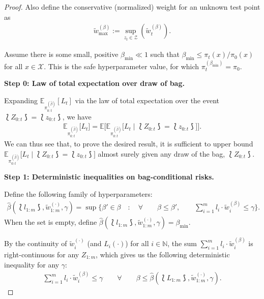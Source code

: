 \begin{proof}
Also define the conservative (normalized) weight for an unknown test point as
\begin{align*}
    \tilde{w}_{\max}^{(\beta)}:=\sup_{z_t\in \mathcal{Z}}(\tilde{w}_t^{(\beta)}).
\end{align*}

Assume there is some small, positive $\beta_{\min}\ll1$ such that $\beta_{\min}\leq \pi_t(x)/\pi_0(x)$ for all $x\in \mathcal{X}$. This is the safe hyperparameter value, for which $\pi_t^{(\beta_{\min})}=\pi_0$.

\vspace{1cm}


\textbf{Step 0: Law of total expectation over draw of bag.}

Expanding $\mathbb{E}_{\pi_{0:t}^{(\hat\beta)}}[L_{t}]$ via the law of total expectation over the event $\lbag Z_{0:t} \rbag = \lbag z_{0:t} \rbag$, we have
\begin{align}\label{eq:cpc_step_0}
    \mathbb{E}_{\pi_{0:t}^{(\hat\beta)}}\big[L_{t}\big] = \mathbb{E}\Big[\mathbb{E}_{\pi_{0:t}^{(\hat\beta)}}\Big[L_{t} \mid \lbag Z_{0:t} \rbag = \lbag z_{0:t} \rbag\Big]\Big].
\end{align}
We can thus see that, to prove the desired result, it is sufficient to upper bound $\mathbb{E}_{\pi_{0:t}^{(\hat\beta)}}\big[L_{t} \mid \lbag Z_{0:t} \rbag = \lbag z_{0:t} \rbag\big]$ almost surely given any draw of the bag, $\lbag Z_{0:t}\rbag$. 


\vspace{1cm}

\textbf{Step 1: Deterministic inequalities on bag-conditional risks.} 


Define the following family of hyperparameters:
\begin{align*}
    \hat{\beta}(\lbag l_{1:m} \rbag, \tilde{w}_{1:m}^{(\cdot)},  \gamma) = \sup \Big\{\beta' \in \beta \quad : \quad \forall \qquad \beta \leq \beta', \qquad \sum_{i=1}^ml_i\cdot \tilde{w}_i^{(\beta)} \leq \gamma \Big\}.
\end{align*}
When the set is empty, define $\hat{\beta}(\lbag l_{1:m} \rbag, \tilde{w}_{1:m}^{(\cdot)},  \gamma)=\beta_{\min}$.

By the continuity of $\tilde{w}_{i}^{(\cdot)}$ (and $L_i(\cdot)$) for all $i\in \mathbb{N}$, the sum $\sum_{i=1}^ml_i\cdot \tilde{w}_i^{(\beta)}$ is right-continuous for any $Z_{1:m}$, which gives us the following deterministic inequality for any $\gamma$:
\begin{align}
    \label{eq:cpc_step_1}
    \sum_{i=1}^ml_i\cdot \tilde{w}_i^{(\beta)} \leq \gamma \qquad \forall \qquad \beta \leq \hat{\beta}(\lbag L_{1:m} \rbag, \tilde{w}_{1:m}^{(\cdot)},  \gamma).
\end{align}



\end{proof}
